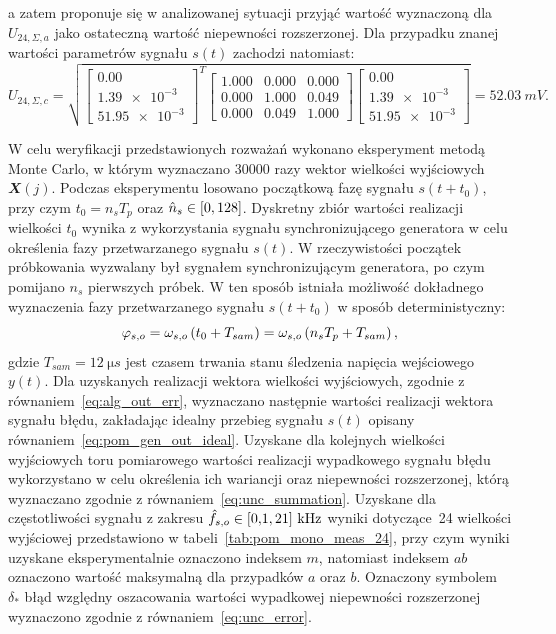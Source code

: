a zatem proponuje się w analizowanej sytuacji przyjąć wartość wyznaczoną dla $U_{24,\Sigma,a}$ jako ostateczną wartość niepewności rozszerzonej. Dla przypadku znanej wartości parametrów sygnału $s(t)$ zachodzi natomiast:
\begin{equation}
U_{24,\Sigma,c} = \sqrt{
\begin{bmatrix}
\num{0.00} \\ \num{1.39e-3} \\ \num{51.95e-3}
\end{bmatrix}^{T}
\begin{bmatrix}
\num{1.000} & \num{0.000} & \num{0.000} \\
\num{0.000} & \num{1.000} & \num{0.049} \\
\num{0.000} & \num{0.049} & \num{1.000}
\end{bmatrix}
\begin{bmatrix}
\num{0.00} \\ \num{1.39e-3} \\ \num{51.95e-3}
\end{bmatrix}} = \qty{52.03}{mV}
\label{eq:pom_mono_all_unc_c}.
\end{equation}

W celu weryfikacji przedstawionych rozważań wykonano eksperyment metodą Monte Carlo, w którym wyznaczano \num{30000} razy wektor wielkości wyjściowych $\mathbfit{X}(j)$. Podczas eksperymentu losowano początkową fazę sygnału $s(t+t_{0})$, przy czym $t_{0} = n_{s} T_{p}$ oraz $\hat{n}_{s} \in \interval{0}{128}$. Dyskretny zbiór wartości realizacji wielkości $t_{0}$ wynika z wykorzystania sygnału synchronizującego generatora w celu określenia fazy przetwarzanego sygnału $s(t)$. W rzeczywistości początek próbkowania wyzwalany był sygnałem synchronizującym generatora, po czym pomijano $n_{s}$ pierwszych próbek. W ten sposób istniała możliwość dokładnego wyznaczenia fazy przetwarzanego sygnału $s(t+t_{0})$ w sposób deterministyczny:
\begin{equation}
\varphi_{s,o} = \omega_{s,o} \left(t_{0} + T_{sam}\right) = \omega_{s,o} \left(n_{s} T_{p} + T_{sam}\right) \label{eq:pom_mono_delay},
\end{equation}
gdzie $T_{sam} = \qty{12}{\micro s}$ jest czasem trwania stanu śledzenia napięcia wejściowego $y(t)$. Dla uzyskanych realizacji wektora wielkości wyjściowych, zgodnie z równaniem~\eqref{eq:alg_out_err}, wyznaczano następnie wartości realizacji wektora sygnału błędu, zakładając idealny przebieg sygnału $s(t)$ opisany równaniem~\eqref{eq:pom_gen_out_ideal}. Uzyskane dla kolejnych wielkości wyjściowych toru pomiarowego wartości realizacji wypadkowego sygnału błędu wykorzystano w celu określenia ich wariancji oraz niepewności rozszerzonej, którą wyznaczano zgodnie z równaniem~\eqref{eq:unc_summation}. Uzyskane dla częstotliwości sygnału z zakresu $\hat{f}_{s,o} \in \interval{\num{0.1}}{\num{21}}~\unit{kHz}$ wyniki dotyczące~\qty{24}{\numTej} wielkości wyjściowej przedstawiono w tabeli~\ref{tab:pom_mono_meas_24}, przy czym wyniki uzyskane eksperymentalnie oznaczono indeksem $m$, natomiast indeksem $ab$ oznaczono wartość maksymalną dla przypadków $a$ oraz $b$. Oznaczony symbolem $\delta_{*}$ błąd względny oszacowania wartości wypadkowej niepewności rozszerzonej wyznaczono zgodnie z równaniem~\eqref{eq:unc_error}.

